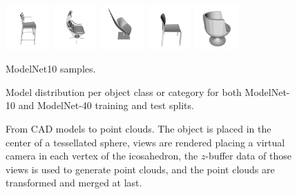 \begin{figure}[!t]
	\includegraphics[width=0.15\textwidth]{Figures/ObjRecog/chair_0}\hfill
	\includegraphics[width=0.15\textwidth]{Figures/ObjRecog/chair_1}\hfill
	\includegraphics[width=0.15\textwidth]{Figures/ObjRecog/chair_2}\hfill
	\includegraphics[width=0.15\textwidth]{Figures/ObjRecog/chair_3}\hfill
	\includegraphics[width=0.15\textwidth]{Figures/ObjRecog/chair_4}\hfill
	\caption{ModelNet10 samples.}
	\label{fig:objrecog:modelnet_models}
\end{figure}

\clearpage

\begin{figure}[!h]
    \centering
    
    \caption{Model distribution per object class or category for both ModelNet-10 and ModelNet-40 training and test splits.}
    \label{fig:objrecog:modelnet_distribution}
\end{figure}

\begin{figure}[!htb]
	\centering
	\resizebox{\textwidth}{!}{
		
	}
	\caption{From \acs{CAD} models to point clouds. The object is placed in the center of a tessellated sphere, views are rendered placing a virtual camera in each vertex of the icosahedron, the $z$-buffer data of those views is used to generate point clouds, and the point clouds are transformed and merged at last.}
	\label{fig:objrecog:adapter}
\end{figure}

